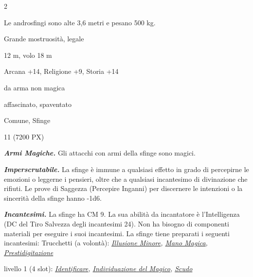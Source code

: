 \begin{multicols}{2}
{Le androsfingi sono alte 3,6 metri e pesano 500 kg.

\begin{description}[noitemsep, topsep=0pt, parsep=0pt, partopsep=0pt, itemsep=1pt, leftmargin=2.35cm,  labelwidth=2.2cm, itemindent=0cm, listparindent=0pt] %
\setlength{\baselineskip}{10pt}
\item[\textbf{Taglia/Tipo}] Grande mostruosità, legale
\item[\textbf{Caratt.}] 
\item[\textbf{Punti Ferita}] 
\item[\textbf{Movimento}] 12 m, volo 18 m
\item[\textbf{Tiri Salvez.}] 
\item[\textbf{Comp.}] Arcana +14, Religione +9, Storia +14
\item[\textbf{Res. Danni}] da arma non magica
\item[\textbf{Immunità}] affascinato, spaventato
\item[\textbf{Sensi}] 
\item[\textbf{Linguaggi}] Comune, Sfinge
\item[\textbf{Sfida}] 11 (7200 PX)
\end{description}
\smallskip

\emph{\textbf{Armi Magiche.}} Gli attacchi con armi della sfinge sono magici.

\emph{\textbf{Imperscrutabile.}} La sfinge è immune a qualsiasi effetto in grado di percepirne le emozioni o leggerne i pensieri, oltre che a qualsiasi incantesimo di divinazione che rifiuti. Le prove di Saggezza (Percepire Inganni) per discernere le intenzioni o la sincerità della sfinge hanno -1d6.

\emph{\textbf{Incantesimi.}} La sfinge ha CM 9. La sua abilità da incantatore è l'Intelligenza (DC del Tiro Salvezza degli incantesimi 24). Non ha bisogno di componenti materiali per eseguire i suoi incantesimi. La sfinge tiene preparati i seguenti incantesimi: Trucchetti (a volontà): \emph{\hyperlink{Illusione Minore}{Illusione Minore}, \hyperlink{Mano Magica}{Mano Magica},} \emph{\hyperlink{Prestidigitazione}{Prestidigitazione}}

livello 1 (4 slot): \emph{\hyperlink{Identificare}{Identificare}, \hyperlink{Individuazione del Magico}{Individuazione del Magico}, \hyperlink{Scudo}{Scudo}}

}
\end{multicols}

